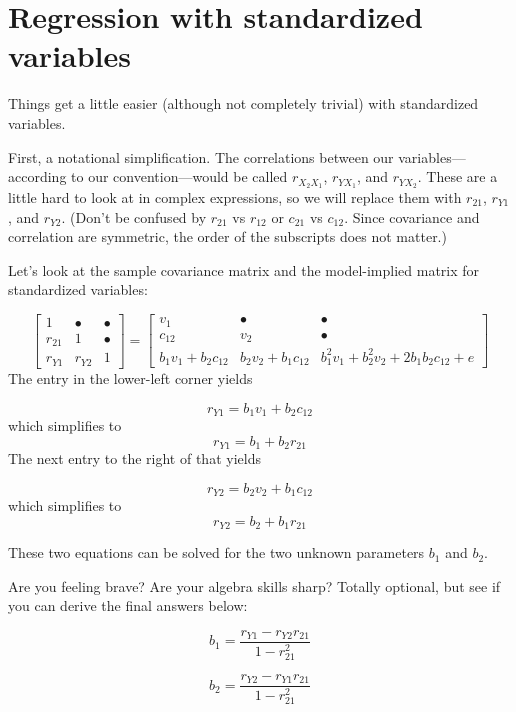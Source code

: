 \documentclass[
]{book}
\begin{document}
\hypertarget{multiple-standardized}{%
\section{Regression with standardized variables}\label{multiple-standardized}}

Things get a little easier (although not completely trivial) with standardized variables.

First, a notational simplification. The correlations between our variables---according to our convention---would be called \(r_{X_{2}X_{1}}\), \(r_{YX_{1}}\), and \(r_{YX_{2}}\). These are a little hard to look at in complex expressions, so we will replace them with \(r_{21}\), \(r_{Y1}\), and \(r_{Y2}\). (Don't be confused by \(r_{21}\) vs \(r_{12}\) or \(c_{21}\) vs \(c_{12}\). Since covariance and correlation are symmetric, the order of the subscripts does not matter.)

Let's look at the sample covariance matrix and the model-implied matrix for standardized variables:

\[
\begin{bmatrix}
1       &   \bullet &   \bullet    \\
r_{21}  &   1       &   \bullet    \\
r_{Y1}  &   r_{Y2}  &   1
\end{bmatrix} = 
\begin{bmatrix}
v_{1}   &    \bullet  &   \bullet \\
c_{12}  &    v_{2}   &    \bullet \\
b_{1} v_{1} + b_{2} c_{12} &    b_{2} v_{2} + b_{1} c_{12} &   b_{1}^{2} v_{1} + b_{2}^{2} v_{2} + 2b_{1}b_{2} c_{12} + e
\end{bmatrix}
\]
The entry in the lower-left corner yields

\[
r_{Y1} = b_{1} v_{1} + b_{2} c_{12}
\]
which simplifies to
\[
r_{Y1} = b_{1} + b_{2} r_{21}
\]
The next entry to the right of that yields

\[
r_{Y2} = b_{2} v_{2} + b_{1} c_{12}
\]
which simplifies to
\[
r_{Y2} = b_{2} + b_{1} r_{21}
\]

These two equations can be solved for the two unknown parameters \(b_{1}\) and \(b_{2}\).

Are you feeling brave? Are your algebra skills sharp? Totally optional, but see if you can derive the final answers below:

\[
b_{1} = \frac{r_{Y1} - r_{Y2}r_{21}}{1 - r_{21}^{2}}
\]

\[
b_{2} = \frac{r_{Y2} - r_{Y1}r_{21}}{1 - r_{21}^{2}}
\]
\end{document}

